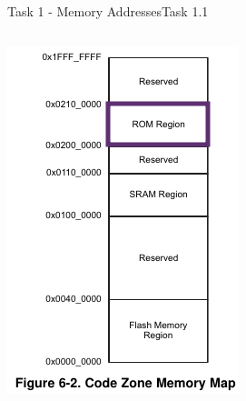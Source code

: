\begin{frame}[allowframebreaks]{Task 1 - Memory Addresses}{Task 1.1\vspace{0.25cm}}
\begin{solution}
\begin{columns}
\begin{column}{0.3\paperwidth}
        \includegraphics[height=0.4\paperheight]{./figures/rom.png}


\end{column}
\end{columns}
\end{solution}
\end{frame}
